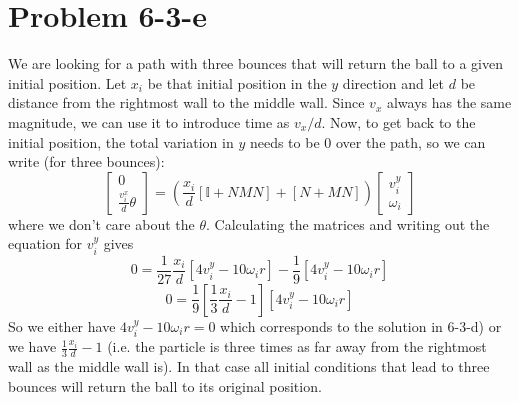 \section*{Problem 6-3-e}
We are looking for a path with three bounces that will return the ball to a given initial position. Let $x_i$ be that initial position in the $y$ direction and let $d$ be distance from the rightmost wall to the middle wall. Since $v_x$ always has the same magnitude, we can use it to introduce time as $v_x/d$. Now, to get back to the initial position, the total variation in $y$ needs to be $0$ over    
the path, so we can write (for three bounces):
\[\begin{bmatrix} 0 \\ \frac{v_i^x}{d} \theta \end{bmatrix} = \left( \frac{x_i}{d} \left[\mathbb{I}+NMN\right] + \left[ N + MN \right] \right) \begin{bmatrix} v_i^y\\ \omega_i \end{bmatrix}    \]
where we don't care about the $\theta$. Calculating the matrices and writing out the equation for $v_i^y$ gives
\[ 0 = \frac{1}{27} \frac{x_i}{d} [4 v_i^y - 10 \omega_i r] - \frac{1}{9}  [4 v_i^y - 10 \omega_i r] \]
\[ 0 =  \frac{1}{9} \left[ \frac{1}{3}\frac{x_i}{d} - 1\right][4 v_i^y - 10 \omega_i r] \]
So we either have $4 v_i^y - 10 \omega_i r=0$ which corresponds to the solution in 6-3-d) or we have $\frac{1}{3}\frac{x_i}{d} - 1$ (i.e. the particle is three times as far away from the rightmost wall as the middle wall is). In that case all initial conditions that lead to three bounces will return the ball to its original position.
